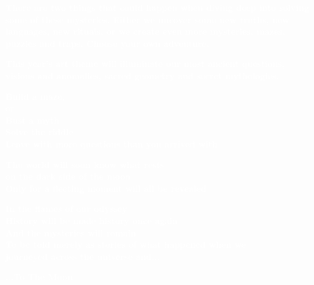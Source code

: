 \textbf{\textcolor{white}{There are two things that could happen when diving deep into solving some of these mysteries. Either we uncover some new truths, new languages, new rituals, or we create even more mysteries, mazes, puzzles and traps. Choose your own adventure.}}

\textbf{\textcolor{white}{This year’s art theme will illuminate our most ancient questions, visions and anomalies, sacred geometry and secret mythologies.}}


\begin{center}
\end{center}

\vspace{1pt}

\begin{multicols}{2}
\begin{centering}
\textbf{\textcolor{white}{Build a maze,\\
or\\Bust a myth\\
Solve the riddle\\
Leave with more questions than you arrived with}}


\textbf{\textcolor{white}{The world will soon know what rests\\
on the dark side of the moon\\
Only for a fleeting moment will all be revealed}}


\textbf{\textcolor{white}{In the flames of our odyssey\\
History will be made history once again\\
And the mysteries will remain\\
To be told merely as stories of what happened when we\\
journeyed across the universe and... \\}}
\end{centering}

\begin{flushright}
\textbf{\textcolor{white}{...To The Moon}}
\end{flushright}

\end{multicols}

\ifisflight
  \twocolumn
\fi

